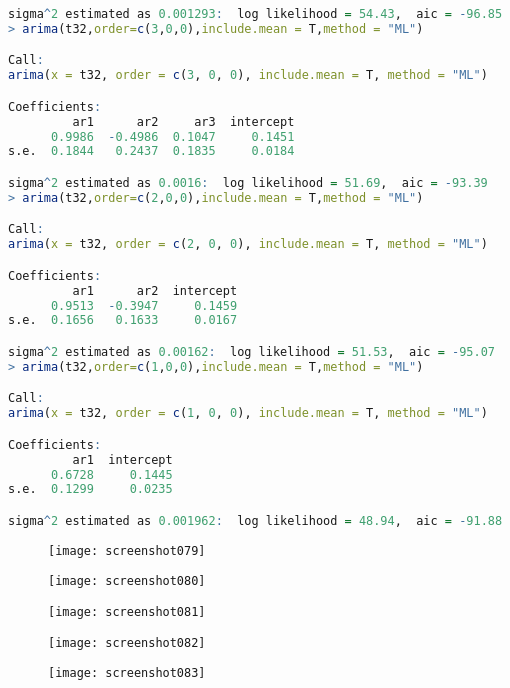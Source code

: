 \documentclass[11pt,a4paper,oneside]{book}
\begin{document}
\begin{lstlisting}[language=r]
sigma^2 estimated as 0.001293:  log likelihood = 54.43,  aic = -96.85
> arima(t32,order=c(3,0,0),include.mean = T,method = "ML")

Call:
arima(x = t32, order = c(3, 0, 0), include.mean = T, method = "ML")

Coefficients:
         ar1      ar2     ar3  intercept
      0.9986  -0.4986  0.1047     0.1451
s.e.  0.1844   0.2437  0.1835     0.0184

sigma^2 estimated as 0.0016:  log likelihood = 51.69,  aic = -93.39
> arima(t32,order=c(2,0,0),include.mean = T,method = "ML")

Call:
arima(x = t32, order = c(2, 0, 0), include.mean = T, method = "ML")

Coefficients:
         ar1      ar2  intercept
      0.9513  -0.3947     0.1459
s.e.  0.1656   0.1633     0.0167

sigma^2 estimated as 0.00162:  log likelihood = 51.53,  aic = -95.07
> arima(t32,order=c(1,0,0),include.mean = T,method = "ML")

Call:
arima(x = t32, order = c(1, 0, 0), include.mean = T, method = "ML")

Coefficients:
         ar1  intercept
      0.6728     0.1445
s.e.  0.1299     0.0235

sigma^2 estimated as 0.001962:  log likelihood = 48.94,  aic = -91.88
\end{lstlisting}

\begin{figure}[H]
	\centering
	\texttt{[image: screenshot079]}
	\label{fig:screenshot079}
\end{figure}
\begin{figure}[H]
	\centering
	\texttt{[image: screenshot080]}
	\label{fig:screenshot080}
\end{figure}
\begin{figure}[H]
	\centering
	\texttt{[image: screenshot081]}
	\label{fig:screenshot081}
\end{figure}
\begin{figure}[H]
	\centering
	\texttt{[image: screenshot082]}
	\label{fig:screenshot082}
\end{figure}
\begin{figure}[H]
	\centering
	\texttt{[image: screenshot083]}
	\label{fig:screenshot083}
\end{figure}

\end{document}
